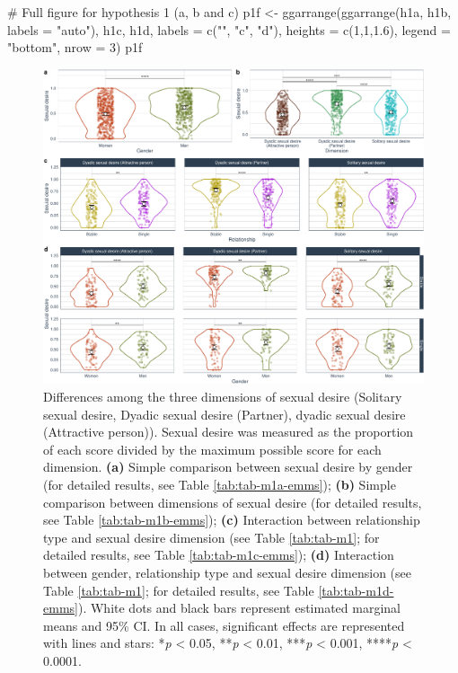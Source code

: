 \documentclass[
  bookmarksnumbered]{article}
\newenvironment{Shaded}{\begin{snugshade}}{\end{snugshade}}
\newcommand{\AttributeTok}[1]{\textcolor[rgb]{0.80,0.80,0.80}{#1}}
\newcommand{\CommentTok}[1]{\textcolor[rgb]{0.50,0.62,0.50}{#1}}
\newcommand{\DecValTok}[1]{\textcolor[rgb]{0.86,0.86,0.80}{#1}}
\newcommand{\FloatTok}[1]{\textcolor[rgb]{0.75,0.75,0.82}{#1}}
\newcommand{\FunctionTok}[1]{\textcolor[rgb]{0.94,0.94,0.56}{#1}}
\newcommand{\NormalTok}[1]{\textcolor[rgb]{0.80,0.80,0.80}{#1}}
\newcommand{\OtherTok}[1]{\textcolor[rgb]{0.94,0.94,0.56}{#1}}
\newcommand{\StringTok}[1]{\textcolor[rgb]{0.80,0.58,0.58}{#1}}
\begin{document}
\begin{Shaded}
\begin{Highlighting}[]
\CommentTok{\# Full figure for hypothesis 1 (a, b and c)}
\NormalTok{p1f }\OtherTok{\textless{}{-}} \FunctionTok{ggarrange}\NormalTok{(}\FunctionTok{ggarrange}\NormalTok{(h1a, h1b, }\AttributeTok{labels =} \StringTok{"auto"}\NormalTok{),}
\NormalTok{                 h1c,}
\NormalTok{                 h1d,}
                 \AttributeTok{labels =} \FunctionTok{c}\NormalTok{(}\StringTok{""}\NormalTok{, }\StringTok{"c"}\NormalTok{, }\StringTok{"d"}\NormalTok{),}
                 \AttributeTok{heights =} \FunctionTok{c}\NormalTok{(}\DecValTok{1}\NormalTok{,}\DecValTok{1}\NormalTok{,}\FloatTok{1.6}\NormalTok{),}
                 \AttributeTok{legend =} \StringTok{"bottom"}\NormalTok{,}
                 \AttributeTok{nrow =} \DecValTok{3}\NormalTok{)}
\NormalTok{p1f}
\end{Highlighting}
\end{Shaded}

\begin{figure}
\centering
\includegraphics{Sexual_Desire_Arousal_files/figure-latex/fig-h1-1.pdf}
\caption{\label{fig:fig-h1}Differences among the three dimensions of sexual desire (Solitary sexual desire, Dyadic sexual desire (Partner), dyadic sexual desire (Attractive person)). Sexual desire was measured as the proportion of each score divided by the maximum possible score for each dimension. \textbf{(a)} Simple comparison between sexual desire by gender (for detailed results, see Table \ref{tab:tab-m1a-emms}); \textbf{(b)} Simple comparison between dimensions of sexual desire (for detailed results, see Table \ref{tab:tab-m1b-emms}); \textbf{(c)} Interaction between relationship type and sexual desire dimension (see Table \ref{tab:tab-m1}; for detailed results, see Table \ref{tab:tab-m1c-emms}); \textbf{(d)} Interaction between gender, relationship type and sexual desire dimension (see Table \ref{tab:tab-m1}; for detailed results, see Table \ref{tab:tab-m1d-emms}). White dots and black bars represent estimated marginal means and 95\% CI. In all cases, significant effects are represented with lines and stars: *\emph{p} \textless{} 0.05, **\emph{p} \textless{} 0.01, ***\emph{p} \textless{} 0.001, ****\emph{p} \textless{} 0.0001.}
\end{figure}
\end{document}
